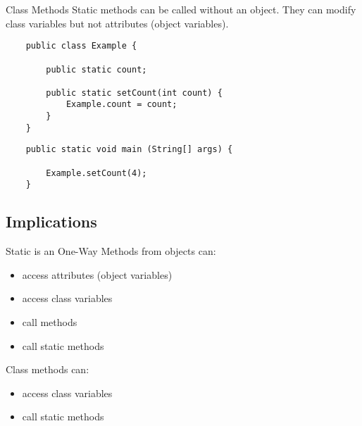 \begin{frame}[fragile]{Class Methods}
	Static methods can be called without an object.
	They can modify class variables but not attributes (object variables).
	\begin{lstlisting}
	public class Example {
	
	    public static count;

	    public static setCount(int count) {
	        Example.count = count;
	    }
	}
	\end{lstlisting}
	\begin{lstlisting}
	public static void main (String[] args) {
	        
	    Example.setCount(4);
	}
	\end{lstlisting}
\end{frame}

\subsection{Implications}
\begin{frame}[fragile]{Static is an One-Way}
	Methods from objects can:
	\begin{itemize}
		\item access attributes (object variables)
		\item access class variables
		\item call methods
		\item call static methods
	\end{itemize}
	Class methods can:
	\begin{itemize}
		\item access class variables
		\item call static methods
	\end{itemize}
\end{frame}



